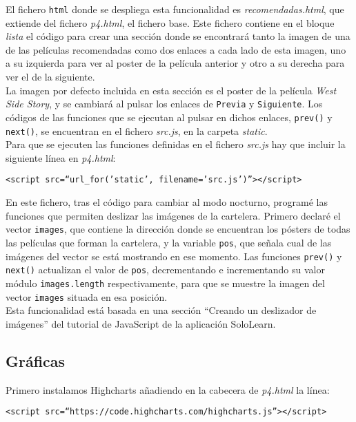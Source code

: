 \documentclass{article}
\begin{document}
El fichero \texttt{html} donde se despliega esta funcionalidad es \textit{recomendadas.html}, que extiende del fichero \textit{p4.html}, el fichero base. Este fichero contiene en el bloque \textit{lista} el código para crear una sección donde se encontrará tanto la imagen de una de las películas recomendadas como dos enlaces a cada lado de esta imagen, uno a su izquierda para ver al poster de la película anterior y otro a su derecha para ver el de la siguiente.\\

La imagen por defecto incluida en esta sección es el poster de la película \textit{West Side Story}, y se cambiará al pulsar los enlaces de \texttt{Previa} y \texttt{Siguiente}. Los códigos de las funciones que se ejecutan al pulsar en dichos enlaces, \texttt{prev()} y \texttt{next()}, se encuentran en el fichero \textit{src.js}, en la carpeta \textit{static}.\\

Para que se ejecuten las funciones definidas en el fichero \textit{src.js} hay que incluir la siguiente línea en \textit{p4.html}:
\begin{center}
  \texttt{<script src=``{{url\_for('static', filename='src.js')}}''></script>}
\end{center}

En este fichero, tras el código para cambiar al modo nocturno, programé las funciones que permiten deslizar las imágenes de la cartelera. Primero declaré el vector \texttt{images}, que contiene la dirección donde se encuentran los pósters de todas las películas que forman la cartelera, y la variable \texttt{pos}, que señala cual de las imágenes del vector se está mostrando en ese momento. Las funciones \texttt{prev()} y \texttt{next()} actualizan el valor de \texttt{pos}, decrementando e incrementando su valor módulo \texttt{images.length} respectivamente, para que se muestre la imagen del vector \texttt{images} situada en esa posición.\\

Esta funcionalidad está basada en una sección ``Creando un deslizador de imágenes'' del tutorial de JavaScript de la aplicación SoloLearn. 

\subsection{Gráficas}

Primero instalamos Highcharts añadiendo en la cabecera de \textit{p4.html} la línea:
\vspace{-1mm}
\begin{center}
  \texttt{<script src=``https://code.highcharts.com/highcharts.js''></script>}
\end{center}
\end{document}
